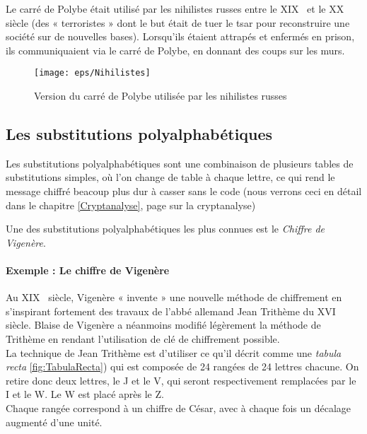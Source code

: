 Le carré de Polybe était utilisé par les nihilistes russes entre le
XIX\ieme~ et le XX\ieme~ siècle (des « terroristes » dont le but était de
tuer le tsar pour reconstruire une société sur de nouvelles
bases). Lorsqu'ils étaient attrapés et enfermés en prison, ils
communiquaient via le carré de Polybe, en donnant des coups sur les
murs. \\ %

\begin{figure}[h]
  \begin{center}
    \texttt{[image: eps/Nihilistes]}
  \end{center}
  \caption{Version du carré de Polybe utilisée par les nihilistes
    russes}
  \label{fig:Nihilistes}
\end{figure}

\subsection{Les substitutions polyalphabétiques\label{SubstitutionPolyalphabetique}}
Les substitutions polyalphabétiques sont une combinaison de plusieurs
tables de substitutions simples, où l'on change de table à chaque
lettre, ce qui rend le message chiffré beacoup plus dur à casser sans
le code (nous verrons ceci en détail dans le chapitre
\ref{Cryptanalyse}, page \pageref{Cryptanalyse} sur la cryptanalyse)

Une des substitutions polyalphabétiques les plus connues est le
\emph{Chiffre de Vigenère}.

\paragraph{Exemple : Le chiffre de Vigenère\label{syst:ChiffreVigenere}}
Au XIX\ieme~ siècle, Vigenère « invente » une nouvelle méthode de
chiffrement en s'inspirant fortement des travaux de l'abbé allemand
Jean Trithème du XVI\ieme~ siècle. Blaise de Vigenère a néanmoins
modifié légèrement la méthode de Trithème en rendant l'utilisation de
clé de chiffrement possible.\\

La technique de Jean Trithème est d'utiliser ce qu'il décrit comme une
\emph{tabula recta}
\ref{fig:TabulaRecta}) qui est composée de 24 rangées de 24
lettres chacune. On retire donc deux lettres, le J et le V, qui seront
respectivement remplacées par le I et le W. Le W est placé après le
Z.\\
Chaque rangée correspond à un chiffre de César,
avec à chaque fois un décalage augmenté d'une unité. \\

